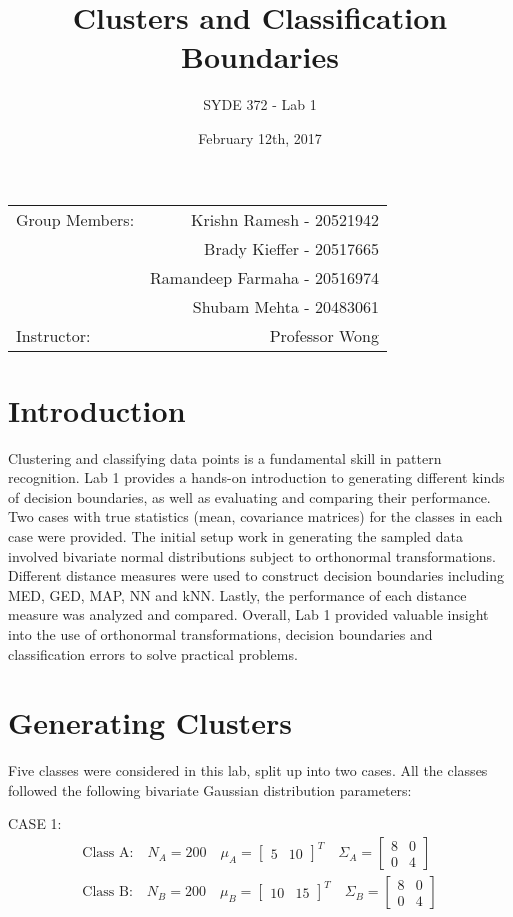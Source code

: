 \documentclass{article}
\title{Clusters and Classification Boundaries} %
\author{SYDE 372 - Lab 1} %
\date{February 12th, 2017} %
\begin{document}
\maketitle

\begin{center}
\begin{tabular}{l r}
Group Members: & Krishn Ramesh - 20521942 \\ %
& Brady Kieffer - 20517665 \\
& Ramandeep Farmaha - 20516974 \\
& Shubam Mehta - 20483061\\
Instructor: & Professor Wong %
\end{tabular}
\end{center}




\section{Introduction}

Clustering and classifying data points is a fundamental skill in pattern recognition. Lab 1 provides a hands-on introduction to generating different kinds of decision boundaries, as well as evaluating and comparing their performance. Two cases with true statistics (mean, covariance matrices) for the classes in each case were provided. The initial setup work in generating the sampled data involved bivariate normal distributions subject to orthonormal transformations. Different distance measures were used to construct decision boundaries including MED, GED, MAP, NN and kNN. Lastly, the performance of each distance measure was analyzed and compared. Overall, Lab 1 provided valuable insight into the use of orthonormal transformations, decision boundaries and classification errors to solve practical problems.



\section{Generating Clusters}
Five classes were considered in this lab, split up into two cases. All the classes followed the following bivariate Gaussian distribution parameters:

CASE 1:
\begin{gather*}
\text{Class A:}\quad N_A = 200 \quad \mu_A = \begin{bmatrix} 5 & 10 \end{bmatrix}^T \quad \Sigma_A = \begin{bmatrix} 8 & 0 \\ 0 & 4  \end{bmatrix} \\
\text{Class B:}\quad N_B = 200 \quad \mu_B = \begin{bmatrix} 10 & 15 \end{bmatrix}^T \quad \Sigma_B = \begin{bmatrix} 8 & 0 \\ 0 & 4  \end{bmatrix}
\end{gather*}
\end{document}
